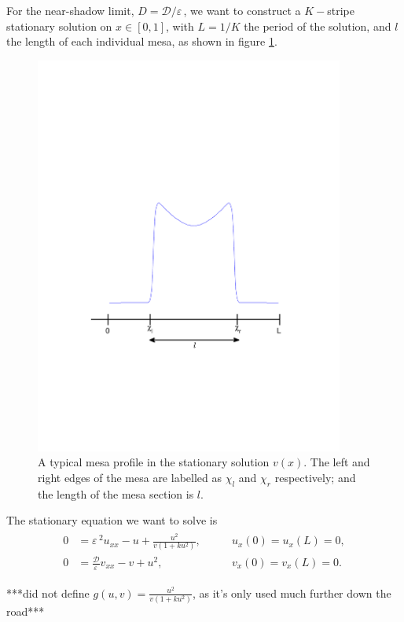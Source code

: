 \documentclass[a4paper,10pt]{article}
\newcommand{\Ep}{\ensuremath{\varepsilon\,}}
\newcommand{\DD}{\ensuremath{\mathcal{D}}}
\begin{document}
For the near-shadow limit, $D=\DD/\Ep$, we want to construct a $K-$stripe stationary solution on $x\in[0,1]$, with $L=1/K$ the period of the solution, and $l$ the length of each individual mesa, as shown in figure \ref{fig:single_mesa}.
% 
\begin{figure}[htb]
\begin{center}
\includegraphics[width=4in]{single_mesa}
\caption{A typical mesa profile in the stationary solution $v(x)$. The left and right edges of the mesa are labelled as $\chi_l$ and $\chi_r$ respectively; and the length of the mesa section is $l$.}
\label{fig:single_mesa}
\end{center}
\end{figure}
% 
The stationary equation we want to solve is
% 
\begin{equation}
\label{eqn:gms_stat}
\begin{split}
\begin{aligned}
	0 &= \Ep^2 u_{xx} -u + \frac{u^2}{v(1+ku^2)},\qquad &u_x(0)=u_x(L)=0, \\
	0 &= \frac{\DD}{\Ep}v_{xx} - v + u^2,\qquad &v_x(0)=v_x(L)=0.
\end{aligned}
\end{split}
\end{equation}
% 

***did not define $g(u,v)=\frac{u^2}{v(1+ku^2)}$, as it's only used much further down the road***
\end{document}
